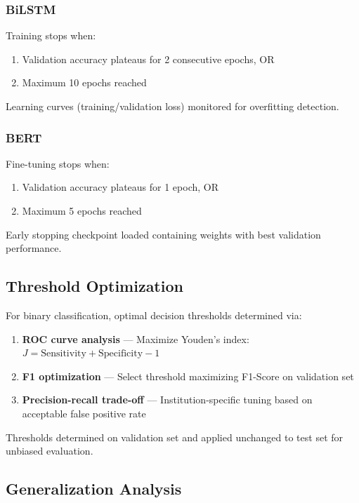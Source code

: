 \subsubsection{BiLSTM}

Training stops when:
\begin{enumerate}
  \item Validation accuracy plateaus for 2 consecutive epochs, OR
  \item Maximum 10 epochs reached
\end{enumerate}

Learning curves (training/validation loss) monitored for overfitting detection.

\subsubsection{BERT}

Fine-tuning stops when:
\begin{enumerate}
  \item Validation accuracy plateaus for 1 epoch, OR
  \item Maximum 5 epochs reached
\end{enumerate}

Early stopping checkpoint loaded containing weights with best validation performance.

\subsection{Threshold Optimization}

For binary classification, optimal decision thresholds determined via:

\begin{enumerate}
  \item \textbf{ROC curve analysis} --- Maximize Youden's index: $J = \text{Sensitivity} + \text{Specificity} - 1$
  
  \item \textbf{F1 optimization} --- Select threshold maximizing F1-Score on validation set
  
  \item \textbf{Precision-recall trade-off} --- Institution-specific tuning based on acceptable false positive rate
\end{enumerate}

Thresholds determined on validation set and applied unchanged to test set for unbiased evaluation.

\subsection{Generalization Analysis}

